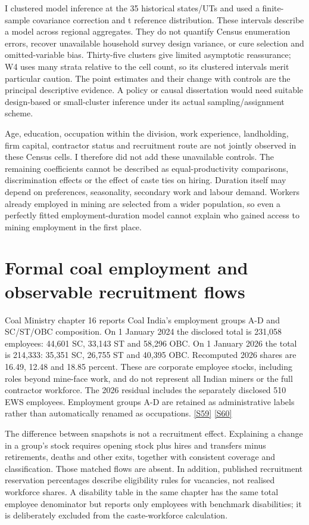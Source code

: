 \documentclass[11pt,a4paper]{report}
\begin{document}
I clustered model inference at the 35 historical states/\allowbreak{}UTs and used a finite-sample covariance correction and t reference distribution. These intervals describe a model across regional aggregates. They do not quantify Census enumeration errors, recover unavailable household survey design variance, or cure selection and omitted-variable bias. Thirty-five clusters give limited asymptotic reassurance; W4 uses many strata relative to the cell count, so its clustered intervals merit particular caution. The point estimates and their change with controls are the principal descriptive evidence. A policy or causal dissertation would need suitable design-based or small-cluster inference under its actual sampling/\allowbreak{}assignment scheme.

Age, education, occupation within the division, work experience, landholding, firm capital, contractor status and recruitment route are not jointly observed in these Census cells. I therefore did not add these unavailable controls. The remaining coefficients cannot be described as equal-productivity comparisons, discrimination effects or the effect of caste ties on hiring. Duration itself may depend on preferences, seasonality, secondary work and labour demand. Workers already employed in mining are selected from a wider population, so even a perfectly fitted employment-duration model cannot explain who gained access to mining employment in the first place.

\section{Formal coal employment and observable recruitment flows}
Coal Ministry chapter 16 reports Coal India's employment groups A-D and SC/\allowbreak{}ST/\allowbreak{}OBC composition. On 1 January 2024 the disclosed total is 231,058 employees: 44,601 SC, 33,143 ST and 58,296 OBC. On 1 January 2026 the total is 214,333: 35,351 SC, 26,755 ST and 40,395 OBC. Recomputed 2026 shares are 16.49, 12.48 and 18.85 percent. These are corporate employee stocks, including roles beyond mine-face work, and do not represent all Indian miners or the full contractor workforce. The 2026 residual includes the separately disclosed 510 EWS employees. Employment groups A-D are retained as administrative labels rather than automatically renamed as occupations. \hyperlink{S59}{[S59]} \hyperlink{S60}{[S60]}

The difference between snapshots is not a recruitment effect. Explaining a change in a group's stock requires opening stock plus hires and transfers minus retirements, deaths and other exits, together with consistent coverage and classification. Those matched flows are absent. In addition, published recruitment reservation percentages describe eligibility rules for vacancies, not realised workforce shares. A disability table in the same chapter has the same total employee denominator but reports only employees with benchmark disabilities; it is deliberately excluded from the caste-workforce calculation.
\end{document}
